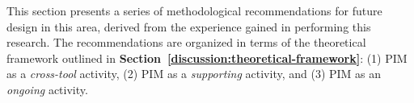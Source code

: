This section presents a series of methodological recommendations for future design in this area, derived from the experience gained in performing this research. The recommendations are organized in terms of the theoretical framework outlined in \textbf{Section~\ref{discussion:theoretical-framework}}: (1) PIM as a \textit{cross-tool} activity, (2) PIM as a \textit{supporting} activity, and (3) PIM as an \textit{ongoing} activity. %


